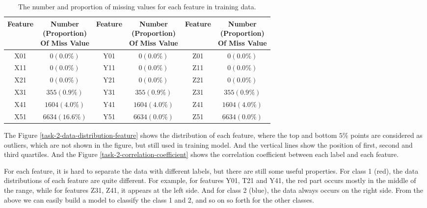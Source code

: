 \documentclass[11pt]{article}
\begin{document}
\begin{table}[H]
  \centering
  \begin{tabular}{|c|c|c|c|c|c|}
    \hline
    Feature & \makecell{Number                                               \\ (Proportion)                               \\ Of Miss Value} & Feature & \makecell{Number \\ (Proportion) \\ Of Miss Value} & Feature & \makecell{Number \\ (Proportion) \\ Of Miss Value} \\
    \hline
    X01     & $0 (0.0\%)$      & Y01 & $0 (0.0\%)$    & Z01 & $0 (0.0\%)$    \\
    \hline
    X11     & $0 (0.0\%)$      & Y11 & $0 (0.0\%)$    & Z11 & $0 (0.0\%)$    \\
    \hline
    X21     & $0 (0.0\%)$      & Y21 & $0 (0.0\%)$    & Z21 & $0 (0.0\%)$    \\
    \hline
    X31     & $355 (0.9\%)$    & Y31 & $355 (0.9\%)$  & Z31 & $355 (0.9\%)$  \\
    \hline
    X41     & $1604 (4.0\%)$   & Y41 & $1604 (4.0\%)$ & Z41 & $1604 (4.0\%)$ \\
    \hline
    X51     & $6634 (16.6\%)$  & Y51 & $6634 (0.0\%)$ & Z51 & $6634 (0.0\%)$ \\
    \hline
  \end{tabular}
  \caption{The number and proportion of missing values for each feature in training data.}
  \label{task-2-missing-value}
\end{table}

The Figure \ref{task-2-data-distribution-feature} shows the distribution of each feature, where the top and bottom $5\%$ points are considered as outliers, which are not shown in the figure, but still used in training model. And the vertical lines show the position of first, second and third quartiles. And the Figure \ref{task-2-correlation-coefficient} shows the correlation coefficient between each label and each feature.

For each feature, it is hard to separate the data with different labels, but there are still some useful properties. For class 1 (red), the data distributions of each feature are quite different. For example, for features Y01, T21 and Y41, the red part occurs mostly in the middle of the range, while for features Z31, Z41, it appears at the left side. And for class 2 (blue), the data always occurs on the right side. From the above we can easily build a model to classify the class 1 and 2, and so on so forth for the other classes.
\end{document}
